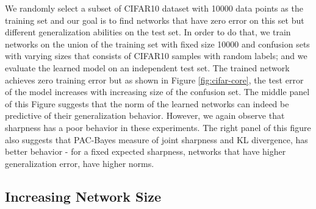 \documentclass{article}
\begin{document}
We randomly select a subset of CIFAR10 dataset with 10000 data points
as the training set and our goal is to find networks that have zero
error on this set but different generalization abilities on the test
set. In order to do that, we train networks on the union of the
training set with fixed size 10000 and confusion sets with varying
sizes that consists of CIFAR10 samples with random labels; and we
evaluate the learned model on an independent test set. The trained
network achieves zero training error but as shown in Figure
\ref{fig:cifar-core}, the test error of the model increases with
increasing size of the confusion set. The middle panel of this Figure
suggests that the norm of the learned networks can indeed be
predictive of their generalization behavior. However, we again observe
that sharpness has a poor behavior in these experiments. The right
panel of this figure also suggests that PAC-Bayes measure of joint
sharpness and KL divergence, has better behavior - for a fixed
expected sharpness, networks that have higher generalization error,
have higher norms.


\subsection*{Increasing Network Size}
\end{document}
